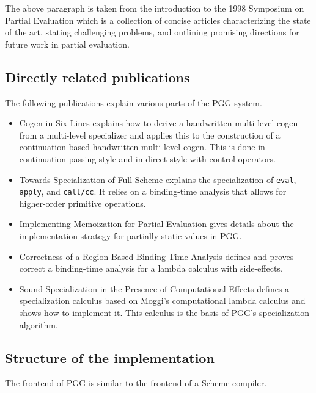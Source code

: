 \documentclass[11pt]{article}
\makeatletter
\newcommand{\indextt}[1]{\index{#1@\texttt{#1}}}
\makeatother
\begin{document}
The above paragraph is taken from the introduction to the 1998
Symposium on Partial 
Evaluation \cite{SOPE1998} which is a collection of concise
articles characterizing the state of the art, stating challenging problems,
and outlining promising directions for future work in partial evaluation.


\subsection{Directly related publications}
\label{sec:publications}

The following publications explain various parts of the PGG system.
\begin{itemize}
\item Cogen in Six Lines \cite{Thiemann1996-icfp} explains how to
  derive a handwritten multi-level cogen from a multi-level
  specializer and applies this to the construction of a
  continuation-based handwritten multi-level cogen. This is done in
  continuation-passing style and in direct style with control
  operators.
\item\indextt{eval}\indextt{apply}
  Towards Specialization of Full Scheme
  \cite{Thiemann1996-reflection} explains the specialization of 
  \texttt{eval}, \texttt{apply}, and \texttt{call/cc}. It relies on a
  binding-time analysis that allows for higher-order primitive
  operations.
\item Implementing Memoization for Partial Evaluation
  \cite{Thiemann1996-plilp} gives details about the implementation
  strategy for partially static values in PGG.
\item Correctness of a Region-Based Binding-Time Analysis
  \cite{Thiemann1997-mfps} defines and proves correct a binding-time
  analysis for a lambda calculus with side-effects.
\item Sound Specialization in the Presence of Computational Effects
  \cite{LawallThiemann1997} defines a specialization calculus based on
  Moggi's computational lambda calculus and shows how to implement
  it. This calculus is the basis of PGG's specialization algorithm.
\end{itemize}


\subsection{Structure of the implementation}
\label{sec:structure}

The frontend of PGG is similar to the frontend of a Scheme compiler.
\end{document}
